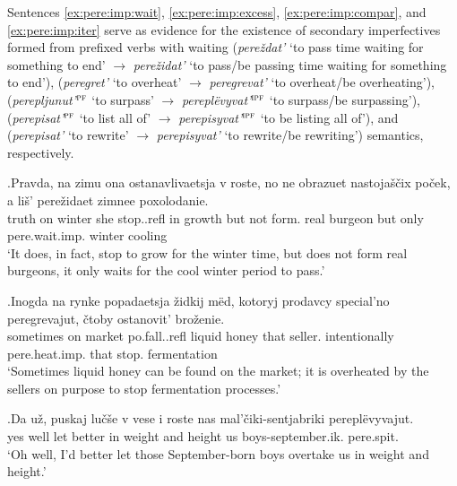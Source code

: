 Sentences \ref{ex:pere:imp:wait}, \ref{ex:pere:imp:excess}, \ref{ex:pere:imp:compar}, and \ref{ex:pere:imp:iter} serve as evidence for the existence of secondary imperfectives formed from prefixed verbs with waiting (\textit{pere\v{z}dat'} `to pass time waiting for something to end' $\rightarrow$ \textit{pere\v{z}idat'}  `to pass/be passing time waiting for something to end'),  (\textit{peregret'} `to overheat' $\rightarrow$ \textit{peregrevat'} `to overheat/be overheating'),  (\textit{perepljunut'$^{\textsc{pf}}$} `to surpass' $\rightarrow$ \textit{perepl\"{e}vyvat'$^{\textsc{ipf}}$} `to surpass/be surpassing'),  (\textit{perepisat'$^{\textsc{pf}}$} `to list all of' $\rightarrow$ \textit{perepisyvat'$^{\textsc{ipf}}$} `to be listing all of'), and  (\textit{perepisat'} `to rewrite' $\rightarrow$ \textit{perepisyvat'} `to rewrite/be rewriting') semantics, respectively.

\exg.\label{ex:pere:imp:wait}Pravda, na zimu ona ostanavlivaetsja v roste, no ne obrazuet nastoja\v{s}\v{c}ix po\v{c}ek, a li\v{s}' pere\v{z}idaet zimnee poxolodanie.\\
truth on winter she stop..refl in growth but not form. real burgeon but only pere.wait.imp. winter cooling\\
\trans `It does, in fact, stop to grow for the winter time, but does not form real burgeons, it only waits for the cool winter period to pass.'\\

\exg.\label{ex:pere:imp:excess}Inogda na rynke popadaetsja \v{z}idkij m\"{e}d, kotoryj prodavcy special'no peregrevajut, \v{c}toby ostanovit' bro\v{z}enie.\\
sometimes on market po.fall..refl liquid honey that seller. intentionally pere.heat.imp. that stop. fermentation\\
`Sometimes liquid honey can be found on the market; it is overheated by the sellers on purpose to stop fermentation processes.'\\

\exg.\label{ex:pere:imp:compar}Da u\v{z}, puskaj lu\v{c}\v{s}e v vese i roste nas mal'\v{c}iki-sentjabriki perepl\"{e}vyvajut.\\
yes well let better in weight and height us boys-september.ik. pere.spit.\\
\trans `Oh well, I'd better let those September-born boys overtake us in weight and height.'


